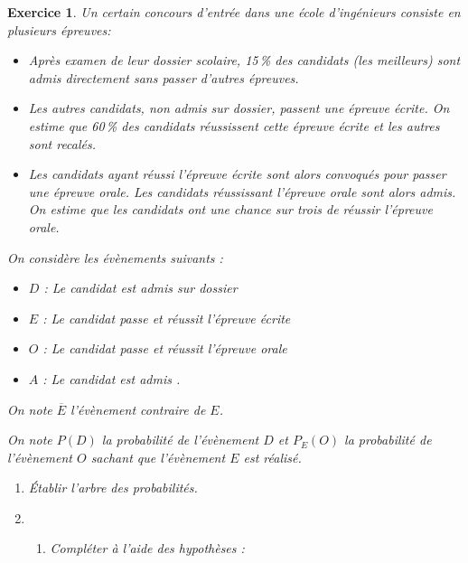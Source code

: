 \documentclass[12pt,a4paper,french]{article}
\theoremstyle{break}
\newtheorem{exercice}{Exercice}
\theoremstyle{nonumberplain}
\theoremstyle{nonumberbreak}
\begin{document}
\begin{exercice}

  Un certain concours d'entrée dans une école d'ingénieurs consiste en
  plusieurs épreuves:

  \setlength\parindent{5mm}
  \begin{itemize}
    \item Après examen de leur dossier scolaire, 15\,\% des candidats
      (les meilleurs) sont admis directement sans passer d'autres
      épreuves.
    \item Les autres candidats, non admis sur dossier, passent
      une épreuve écrite. On estime que 60\,\% des candidats réussissent
      cette épreuve écrite et les autres sont recalés.
    \item Les candidats ayant réussi l'épreuve écrite sont alors
      convoqués pour passer une épreuve orale. Les candidats réussissant
      l'épreuve orale sont alors admis. On estime que les candidats ont
      une chance sur trois de réussir l'épreuve orale.
  \end{itemize}
  \setlength\parindent{0mm}

  On considère les évènements suivants :

  \setlength\parindent{5mm}
  \begin{itemize}
    \item $D$ : \og Le candidat est admis sur dossier \fg
    \item $E$ : \og Le candidat passe et réussit l'épreuve écrite \fg
    \item $O$ : \og Le candidat passe et réussit l'épreuve orale \fg
    \item $A$ : \og Le candidat est admis \fg.
  \end{itemize}
  \setlength\parindent{0mm}

  On note $\overline{E}$ l'évènement contraire de $E$.

  On note $P(D)$ la probabilité de l'évènement $D$ et $P_{E}(O)$ la
  probabilité de l'évènement $O$ sachant que l'évènement $E$ est
  réalisé.

  \begin{enumerate}
    \item Établir l'arbre des probabilités.
    \item \begin{enumerate}
        \item Compléter à l'aide des hypothèses :


\end{enumerate}
\end{enumerate}
\end{exercice}
\end{document}
